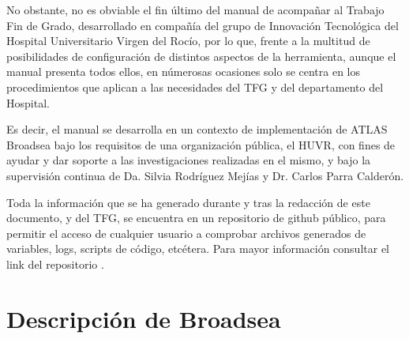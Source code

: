 
No obstante, no es obviable el fin último del manual de acompañar al Trabajo Fin de Grado, desarrollado en compañía del grupo de Innovación Tecnológica del Hospital Universitario Virgen del Rocío, por lo que, frente a la multitud de posibilidades de configuración de distintos aspectos de la herramienta, aunque el manual presenta todos ellos, en númerosas ocasiones solo se centra en los procedimientos que aplican a las necesidades del TFG y del departamento del Hospital.

Es decir, el manual se desarrolla en un contexto de implementación de ATLAS Broadsea bajo los requisitos de una organización pública, el HUVR, con fines de ayudar y dar soporte a las investigaciones realizadas en el mismo, y bajo la supervisión continua de Da. Silvia Rodríguez Mejías y Dr. Carlos Parra Calderón.


Toda la información que se ha generado durante y tras la redacción de este documento, y del TFG, se encuentra en un repositorio de github público, para permitir el acceso de cualquier usuario a comprobar archivos generados de variables, logs, scripts de código, etcétera. Para mayor información consultar el link del repositorio \cite{vallealonsodc}.

\section{Descripción de Broadsea} \label{cap:01.2descripBroadsea}



